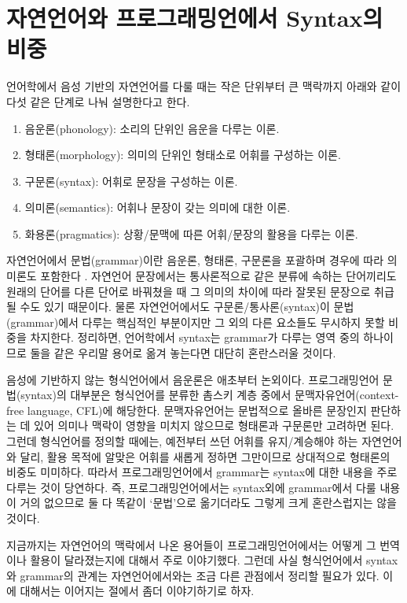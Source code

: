 \documentclass[b5paper,chapter,figtabcapt]{oblivoir}
\providecommand{\tightlist}{%
      \setlength{\itemsep}{0pt}\setlength{\parskip}{0pt}}
\begin{document}
\section{자연언어와 프로그래밍언에서 Syntax의 비중}
\label{sec:NatProgSyn}
언어학에서 음성 기반의 자연언어를 다룰 때는
작은 단위부터 큰 맥락까지 아래와 같이 다섯 같은 단계로 나눠 설명한다고 한다.
\begin{enumerate}\tightlist
    \item 음운론(phonology):
    소리의 단위인 음운을 다루는 이론.
    \item 형태론(morphology):
    의미의 단위인 형태소로 어휘를 구성하는 이론.
    \item 구문론(syntax):
    어휘로 문장을 구성하는 이론.
    \item 의미론(semantics):
    어휘나 문장이 갖는 의미에 대한 이론.
    \item 화용론(pragmatics):
    상황/문맥에 따른 어휘/문장의 활용을 다루는 이론.
\end{enumerate}
자연언어에서 문법(grammar)이란 음운론, 형태론, 구문론을 포괄하며 경우에 따라
의미론도 포함한다 \cite{IntroEngSem}. 자연언어 문장에서는 통사론적으로 같은
분류에 속하는 단어끼리도 원래의 단어를 다른 단어로 바꿔쳤을 때 그 의미의
차이에 따라 잘못된 문장으로 취급될 수도 있기 때문이다. 물론 자연언어에서도
구문론/통사론(syntax)이 문법(grammar)에서 다루는 핵심적인 부분이지만
그 외의 다른 요소들도 무시하지 못할 비중을 차지한다. 정리하면,
언어학에서 syntax는 grammar가 다루는 영역 중의 하나이므로
둘을 같은 우리말 용어로 옮겨 놓는다면 대단히 혼란스러울 것이다.

음성에 기반하지 않는 형식언어에서 음운론은 애초부터 논외이다.
프로그래밍언어 문법(syntax)의 대부분은 형식언어를 분류한 촘스키 계층
중에서 문맥자유언어(context-free language, CFL)에 해당한다.
문맥자유언어는 문법적으로 올바른 문장인지 판단하는 데 있어 의미나 맥락이
영향을 미치지 않으므로 형태론과 구문론만 고려하면 된다. 그런데 형식언어를
정의할 때에는, 예전부터 쓰던 어휘를 유지/계승해야 하는 자연언어와 달리, 
활용 목적에 알맞은 어휘를 새롭게 정하면 그만이므로 상대적으로 형태론의
비중도 미미하다. 따라서 프로그래밍언어에서 grammar는 syntax에 대한 내용을
주로 다루는 것이 당연하다. 즉, 프로그래밍언어에서는 syntax외에 grammar에서
다룰 내용이 거의 없으므로 둘 다 똑같이 `문법'으로 옮기더라도 그렇게 크게
혼란스럽지는 않을 것이다.

지금까지는 자연언어의 맥락에서 나온 용어들이 프로그래밍언어에서는 어떻게
그 번역이나 활용이 달라졌는지에 대해서 주로 이야기했다. 그런데 사실
형식언어에서 syntax와 grammar의 관계는 자연언어에서와는 조금 다른 관점에서
정리할 필요가 있다. 이에 대해서는 이어지는 절에서 좀더 이야기하기로 하자.
\end{document}
